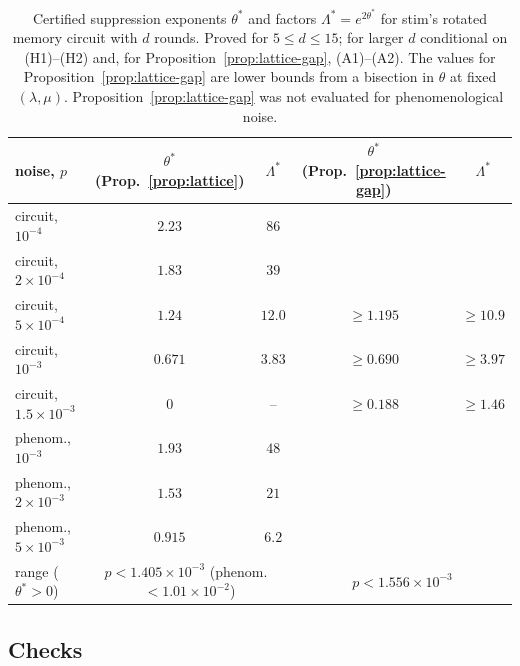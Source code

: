 \documentclass[11pt]{article}
\theoremstyle{plain}
\theoremstyle{definition}
\theoremstyle{remark}
\renewcommand{\_}{\oldunderscore\allowbreak}
\begin{document}
\begin{table}[!htb]
\centering\small
\begin{tabular}{lcccc}
\toprule
noise, $p$ & $\theta^\ast$ (Prop.~\ref{prop:lattice}) & $\Lambda^\ast$ & $\theta^\ast$ (Prop.~\ref{prop:lattice-gap}) & $\Lambda^\ast$\\
\midrule
circuit, $10^{-4}$ & $2.23$ & $86$ & & \\
circuit, $2\times10^{-4}$ & $1.83$ & $39$ & & \\
circuit, $5\times10^{-4}$ & $1.24$ & $12.0$ & $\ge1.195$ & $\ge10.9$\\
circuit, $10^{-3}$ & $0.671$ & $3.83$ & $\ge0.690$ & $\ge3.97$\\
circuit, $1.5\times10^{-3}$ & $0$ & -- & $\ge0.188$ & $\ge1.46$\\
phenom., $10^{-3}$ & $1.93$ & $48$ & & \\
phenom., $2\times10^{-3}$ & $1.53$ & $21$ & & \\
phenom., $5\times10^{-3}$ & $0.915$ & $6.2$ & & \\
\midrule
range ($\theta^\ast>0$) & \multicolumn{2}{c}{$p<1.405\times10^{-3}$ (phenom.\ $<1.01\times10^{-2}$)} & \multicolumn{2}{c}{$p<1.556\times10^{-3}$}\\
\bottomrule
\end{tabular}
\caption{Certified suppression exponents $\theta^\ast$ and factors $\Lambda^\ast=e^{2\theta^\ast}$ for stim's rotated memory circuit with $d$ rounds. Proved for $5\le d\le15$; for larger $d$ conditional on (H1)--(H2) and, for Proposition~\ref{prop:lattice-gap}, (A1)--(A2). The values for Proposition~\ref{prop:lattice-gap} are lower bounds from a bisection in $\theta$ at fixed $(\lambda,\mu)$. Proposition~\ref{prop:lattice-gap} was not evaluated for phenomenological noise.}\label{tab:lattice}
\end{table}

\subsection{Checks}\label{sec:checks}
\end{document}
